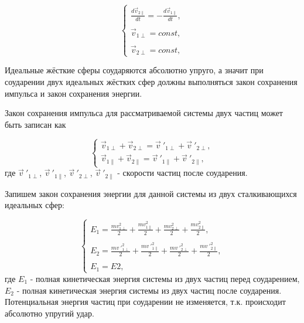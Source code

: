 \documentclass[a4paper]{article}
\begin{document}
\begin{equation}\label{eq:velocities_and_forces_for_two_particles2}
    \begin{cases}
        \displaystyle\frac{d\vec{v}_{2\parallel}}{dt} = -\displaystyle\frac{d\vec{v}_{1\parallel}}{dt},
        \\
        \\
        \vec{v}_{1\perp} = const,
        \\
        \\
        \vec{v}_{2\perp} = const,
    \end{cases}
\end{equation}

Идеальные жёсткие сферы соударяются абсолютно упруго, а значит при соударении двух идеальных жёстких сфер должны выполняться закон сохранения импульса и закон сохранения энергии.

Закон сохранения импульса для рассматриваемой системы двух частиц  может быть записан как

\begin{equation}\label{eq:rule_of_contant_impulse}
    \begin{cases}
        \vec{v}_{1\perp} + \vec{v}_{2\perp} = \vec{v}\ '_{1\perp} + \vec{v}\ '_{2\perp},
        \\
        \vec{v}_{1\parallel} + \vec{v}_{2\parallel} = \vec{v}\ '_{1\parallel} + \vec{v}\ '_{2\parallel},
    \end{cases}
\end{equation}
где $ \vec{v}\ '_{1\perp} $, $ \vec{v}\ '_{1\parallel} $, $ \vec{v}\ '_{2\perp} $, $ \vec{v}\ '_{2\parallel} $ - скорости частиц после соударения.

Запишем закон сохранения энергии для данной системы из двух сталкивающихся идеальных сфер:

\begin{equation}\label{eq:rule_of_contant_energy}
    \begin{cases}
        E_1 = \displaystyle\frac{mv^2_{1\perp}}{2} + \displaystyle\frac{mv^2_{1\parallel}}{2} + \displaystyle\frac{mv^2_{2\perp}}{2} + \displaystyle\frac{mv^2_{2\parallel}}{2},
        \\
        \\
        E_2 = \displaystyle\frac{mv\ '^2_{1\perp}}{2} + \displaystyle\frac{mv\ '^2_{1\parallel}}{2} + \displaystyle\frac{mv\ '^2_{2\perp}}{2} + \displaystyle\frac{mv\ '^2_{2\parallel}}{2},
        \\
        \\
        E_1 = E2,
    \end{cases}
\end{equation}
где $ E_1 $ - полная кинетическая энергия системы из двух частиц перед соударением, $ E_2 $ - полная кинетическая энергия системы из двух частиц после соударения. Потенциальная энергия частиц при соударении не изменяется, т.к. происходит абсолютно упругий удар.
\end{document}
